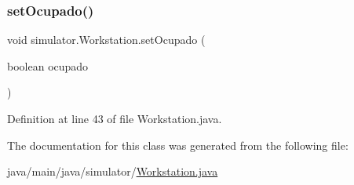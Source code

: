 \mbox{\label{classsimulator_1_1_workstation_abc348d8ecea62cb7893d861ccc041c86}} 
\subsubsection{\texorpdfstring{set\+Ocupado()}{setOcupado()}}
{\footnotesize\ttfamily void simulator.\+Workstation.\+set\+Ocupado (\begin{DoxyParamCaption}\item[{boolean}]{ocupado }\end{DoxyParamCaption})}



Definition at line 43 of file Workstation.\+java.



The documentation for this class was generated from the following file\+:\begin{DoxyCompactItemize}
\item 
java/main/java/simulator/\mbox{\hyperlink{_workstation_8java}{Workstation.\+java}}\end{DoxyCompactItemize}
